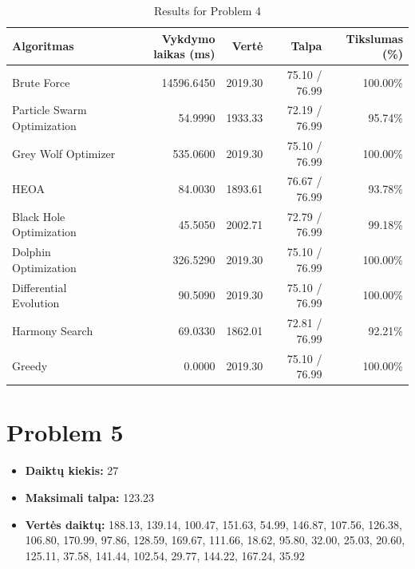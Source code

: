 \documentclass[a4paper,11pt]{article}
\begin{document}
\begin{table}[h!]
\centering
\begin{tabular}{lrrrr}
\toprule
\textbf{Algoritmas} & \textbf{Vykdymo laikas (ms)} & \textbf{Vertė} & \textbf{Talpa} & \textbf{Tikslumas (\%)} \\
\midrule
Brute Force & 14596.6450 & 2019.30 & 75.10 / 76.99 & 100.00\% \\
Particle Swarm Optimization & 54.9990 & 1933.33 & 72.19 / 76.99 & 95.74\% \\
Grey Wolf Optimizer & 535.0600 & 2019.30 & 75.10 / 76.99 & 100.00\% \\
HEOA & 84.0030 & 1893.61 & 76.67 / 76.99 & 93.78\% \\
Black Hole Optimization & 45.5050 & 2002.71 & 72.79 / 76.99 & 99.18\% \\
Dolphin Optimization & 326.5290 & 2019.30 & 75.10 / 76.99 & 100.00\% \\
Differential Evolution & 90.5090 & 2019.30 & 75.10 / 76.99 & 100.00\% \\
Harmony Search & 69.0330 & 1862.01 & 72.81 / 76.99 & 92.21\% \\
Greedy & 0.0000 & 2019.30 & 75.10 / 76.99 & 100.00\% \\
\bottomrule
\end{tabular}
\caption{Results for Problem 4}
\end{table}
\clearpage

\section*{Problem 5}
\begin{itemize}
    \item \textbf{Daiktų kiekis:} 27
    \item \textbf{Maksimali talpa:} 123.23
    \item \textbf{Vertės daiktų:} 188.13, 139.14, 100.47, 151.63, 54.99, 146.87, 107.56, 126.38, 106.80, 170.99, 97.86, 128.59, 169.67, 111.66, 18.62, 95.80, 32.00, 25.03, 20.60, 125.11, 37.58, 141.44, 102.54, 29.77, 144.22, 167.24, 35.92
\end{itemize}
\end{document}

